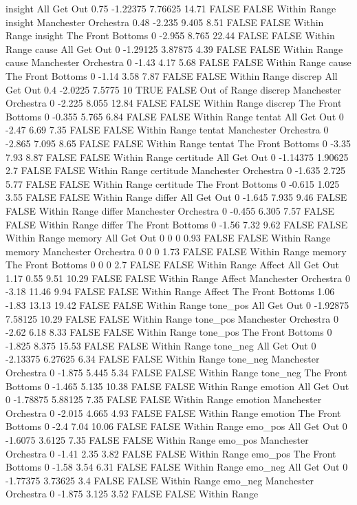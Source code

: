 insight All Get Out 0.75 -1.22375 7.76625 14.71 FALSE FALSE Within Range
insight Manchester Orchestra 0.48 -2.235 9.405 8.51 FALSE FALSE Within Range
insight The Front Bottoms 0 -2.955 8.765 22.44 FALSE FALSE Within Range
cause All Get Out 0 -1.29125 3.87875 4.39 FALSE FALSE Within Range
cause Manchester Orchestra 0 -1.43 4.17 5.68 FALSE FALSE Within Range
cause The Front Bottoms 0 -1.14 3.58 7.87 FALSE FALSE Within Range
discrep All Get Out 0.4 -2.0225 7.5775 10 TRUE FALSE Out of Range
discrep Manchester Orchestra 0 -2.225 8.055 12.84 FALSE FALSE Within Range
discrep The Front Bottoms 0 -0.355 5.765 6.84 FALSE FALSE Within Range
tentat All Get Out 0 -2.47 6.69 7.35 FALSE FALSE Within Range
tentat Manchester Orchestra 0 -2.865 7.095 8.65 FALSE FALSE Within Range
tentat The Front Bottoms 0 -3.35 7.93 8.87 FALSE FALSE Within Range
certitude All Get Out 0 -1.14375 1.90625 2.7 FALSE FALSE Within Range
certitude Manchester Orchestra 0 -1.635 2.725 5.77 FALSE FALSE Within Range
certitude The Front Bottoms 0 -0.615 1.025 3.55 FALSE FALSE Within Range
differ All Get Out 0 -1.645 7.935 9.46 FALSE FALSE Within Range
differ Manchester Orchestra 0 -0.455 6.305 7.57 FALSE FALSE Within Range
differ The Front Bottoms 0 -1.56 7.32 9.62 FALSE FALSE Within Range
memory All Get Out 0 0 0 0.93 FALSE FALSE Within Range
memory Manchester Orchestra 0 0 0 1.73 FALSE FALSE Within Range
memory The Front Bottoms 0 0 0 2.7 FALSE FALSE Within Range
Affect All Get Out 1.17 0.55 9.51 10.29 FALSE FALSE Within Range
Affect Manchester Orchestra 0 -3.18 11.46 9.94 FALSE FALSE Within Range
Affect The Front Bottoms 1.06 -1.83 13.13 19.42 FALSE FALSE Within Range
tone_pos All Get Out 0 -1.92875 7.58125 10.29 FALSE FALSE Within Range
tone_pos Manchester Orchestra 0 -2.62 6.18 8.33 FALSE FALSE Within Range
tone_pos The Front Bottoms 0 -1.825 8.375 15.53 FALSE FALSE Within Range
tone_neg All Get Out 0 -2.13375 6.27625 6.34 FALSE FALSE Within Range
tone_neg Manchester Orchestra 0 -1.875 5.445 5.34 FALSE FALSE Within Range
tone_neg The Front Bottoms 0 -1.465 5.135 10.38 FALSE FALSE Within Range
emotion All Get Out 0 -1.78875 5.88125 7.35 FALSE FALSE Within Range
emotion Manchester Orchestra 0 -2.015 4.665 4.93 FALSE FALSE Within Range
emotion The Front Bottoms 0 -2.4 7.04 10.06 FALSE FALSE Within Range
emo_pos All Get Out 0 -1.6075 3.6125 7.35 FALSE FALSE Within Range
emo_pos Manchester Orchestra 0 -1.41 2.35 3.82 FALSE FALSE Within Range
emo_pos The Front Bottoms 0 -1.58 3.54 6.31 FALSE FALSE Within Range
emo_neg All Get Out 0 -1.77375 3.73625 3.4 FALSE FALSE Within Range
emo_neg Manchester Orchestra 0 -1.875 3.125 3.52 FALSE FALSE Within Range
